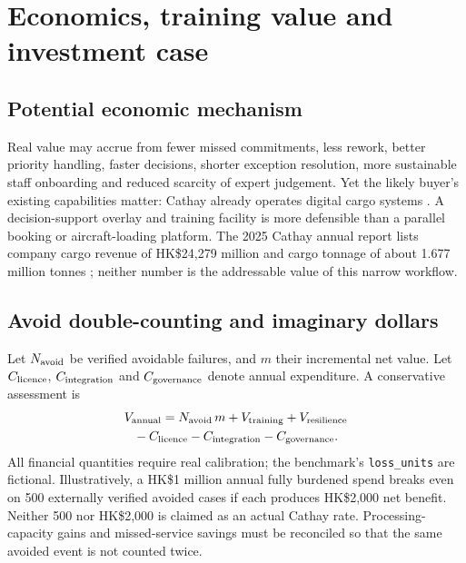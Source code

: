 \documentclass[10pt,a4paper]{article}
\theoremstyle{definition}\newtheorem{definition}[theorem]{Definition}
\theoremstyle{remark}\newtheorem{remark}[theorem]{Remark}
\newcommand{\1}{\mathbbm 1}
\begin{document}
\section{Economics, training value and investment case}
\subsection{Potential economic mechanism}
Real value may accrue from fewer missed commitments, less rework, better priority handling, faster decisions, shorter exception resolution, more sustainable staff onboarding and reduced scarcity of expert judgement. Yet the likely buyer's existing capabilities matter: Cathay already operates digital cargo systems \cite{cathaydigital}. A decision-support overlay and training facility is more defensible than a parallel booking or aircraft-loading platform. The 2025 Cathay annual report lists company cargo revenue of HK\$24,279 million and cargo tonnage of about 1.677 million tonnes \cite{annualreport}; neither number is the addressable value of this narrow workflow.

\subsection{Avoid double-counting and imaginary dollars}
Let $N_{\rm avoid}$ be verified avoidable failures, and $m$ their incremental net value. Let $C_{\rm licence}$, $C_{\rm integration}$ and $C_{\rm governance}$ denote annual expenditure. A conservative assessment is
\begin{multline}
V_{\rm annual}=N_{\rm avoid}\,m+V_{\rm training}+V_{\rm resilience}\\
{}-C_{\rm licence}-C_{\rm integration}-C_{\rm governance}.
\end{multline}
All financial quantities require real calibration; the benchmark's \texttt{loss\_units} are fictional. Illustratively, a HK\$1 million annual fully burdened spend breaks even on 500 externally verified avoided cases if each produces HK\$2,000 net benefit. Neither 500 nor HK\$2,000 is claimed as an actual Cathay rate. Processing-capacity gains and missed-service savings must be reconciled so that the same avoided event is not counted twice.
\end{document}
